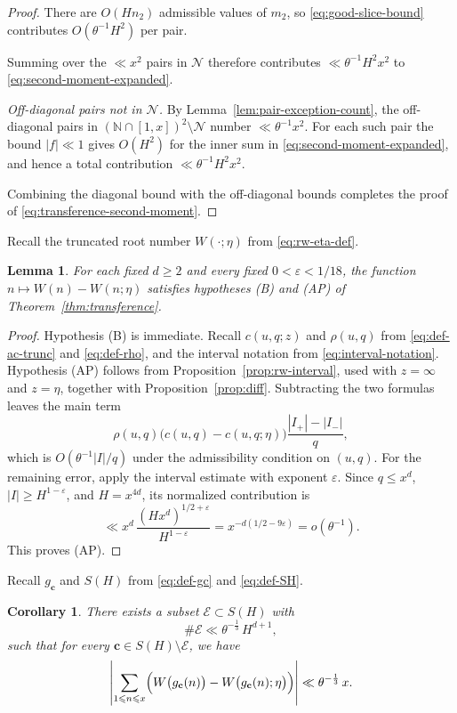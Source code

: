 \documentclass[12pt,reqno]{amsart}
\numberwithin{equation}{section}
\newtheorem{lemma}[theorem]{Lemma}
\newtheorem{corollary}[theorem]{Corollary}
\theoremstyle{definition}
\renewcommand{\le}{\leqslant}
\renewcommand{\ge}{\geqslant}
\newcommand{\NN}{\mathbb{N}}
\newcommand{\cc}{\mathbf{c}}
\newcommand{\rw}{W}
\begin{document}
\begin{proof}
There are $O(Hn_2)$ admissible values of $m_2$, so \eqref{eq:good-slice-bound} contributes $O(\theta^{-1}H^2)$ per pair.

Summing over the $\ll x^2$ pairs in $\mathcal N$ therefore contributes $\ll \theta^{-1}H^2x^2$ to \eqref{eq:second-moment-expanded}.

\noindent\emph{Off-diagonal pairs not in $\mathcal{N}$.} By Lemma~\ref{lem:pair-exception-count}, the off-diagonal pairs in $(\NN\cap[1,x])^2\setminus \mathcal N$ number $\ll \theta^{-1}x^2$.
For each such pair the bound $|f|\ll1$ gives $O(H^2)$ for the inner sum in \eqref{eq:second-moment-expanded}, and hence a total contribution $\ll \theta^{-1}H^2x^2$.

Combining the diagonal bound with the off-diagonal bounds completes the proof of \eqref{eq:transference-second-moment}.
\end{proof}

Recall the truncated root number $\rw(\cdot;\eta)$ from \eqref{eq:rw-eta-def}.
\begin{lemma}\label{lem:j0-trunc-AP}
For each fixed $d\ge2$ and every fixed $0<\varepsilon<1/18$, the function $n\mapsto\rw(n)-\rw(n;\eta)$ satisfies hypotheses \textup{(B)} and \textup{(AP)} of Theorem~\ref{thm:transference}.
\end{lemma}

\begin{proof}
Hypothesis \textup{(B)} is immediate.
Recall $c(u,q;z)$ and $\rho(u,q)$ from \eqref{eq:def-ac-trunc} and \eqref{eq:def-rho}, and the interval notation from \eqref{eq:interval-notation}.
Hypothesis \textup{(AP)} follows from Proposition~\ref{prop:rw-interval}, used with $z=\infty$ and $z=\eta$, together with Proposition~\ref{prop:diff}.
Subtracting the two formulas leaves the main term
\[
\rho(u,q)\bigl(c(u,q)-c(u,q;\eta)\bigr)
\frac{|I_+|-|I_-|}{q},
\]
which is $O(\theta^{-1}|I|/q)$ under the admissibility condition on $(u,q)$.
For the remaining error, apply the interval estimate with exponent $\varepsilon$.
Since $q\le x^d$, $|I|\ge H^{1-\varepsilon}$, and $H=x^{4d}$, its normalized contribution is
\[
\ll x^d\,\frac{(Hx^d)^{1/2+\varepsilon}}{H^{1-\varepsilon}}
=x^{-d(1/2-9\varepsilon)}=o(\theta^{-1}).
\]
This proves \textup{(AP)}.
\end{proof}

Recall $g_\cc$ and $S(H)$ from \eqref{eq:def-gc} and \eqref{eq:def-SH}.
\begin{corollary}\label{cor:pointwise-trunc}
There exists a subset $\mathcal E \subset S(H)$ with
\[
\#\mathcal E \ll \theta^{-\frac{1}{3}}\,H^{d+1},
\]
such that for every $\cc\in S(H)\setminus\mathcal E$, we have
\[
\left|
\sum_{1\le n\le x}
\Bigl(\rw\bigl(g_{\cc}(n)\bigr)-\rw\bigl(g_{\cc}(n); \eta\bigr)\Bigr)
\right|
\ll \theta^{-\frac{1}{3}}\,x.
\]
\end{corollary}
\end{document}

